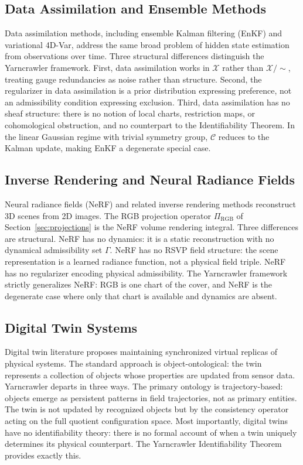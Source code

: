 \documentclass[12pt, oneside]{article}
\newcommand{\Xmod}{\mathcal{X}/{\sim}}
\begin{document}
\subsection{Data Assimilation and Ensemble Methods}

Data assimilation methods, including ensemble Kalman filtering (EnKF) and variational
4D-Var, address the same broad problem of hidden state estimation from observations over
time. Three structural differences distinguish the Yarncrawler framework. First, data
assimilation works in $\mathcal{X}$ rather than $\Xmod$, treating gauge redundancies as
noise rather than structure. Second, the regularizer in data assimilation is a prior
distribution expressing preference, not an admissibility condition expressing exclusion.
Third, data assimilation has no sheaf structure: there is no notion of local charts,
restriction maps, or cohomological obstruction, and no counterpart to the Identifiability
Theorem. In the linear Gaussian regime with trivial symmetry group, $\mathcal{C}$ reduces
to the Kalman update, making EnKF a degenerate special case.

\subsection{Inverse Rendering and Neural Radiance Fields}

Neural radiance fields (NeRF) and related inverse rendering methods reconstruct 3D scenes
from 2D images. The RGB projection operator $\Pi_{\mathrm{RGB}}$ of
Section~\ref{sec:projections} is the NeRF volume rendering integral. Three differences
are structural. NeRF has no dynamics: it is a static reconstruction with no dynamical
admissibility set $\Gamma$. NeRF has no RSVP field structure: the scene representation
is a learned radiance function, not a physical field triple. NeRF has no regularizer
encoding physical admissibility. The Yarncrawler framework strictly generalizes NeRF: RGB
is one chart of the cover, and NeRF is the degenerate case where only that chart is
available and dynamics are absent.

\subsection{Digital Twin Systems}

Digital twin literature proposes maintaining synchronized virtual replicas of physical
systems. The standard approach is object-ontological: the twin represents a collection of
objects whose properties are updated from sensor data. Yarncrawler departs in three ways.
The primary ontology is trajectory-based: objects emerge as persistent patterns in field
trajectories, not as primary entities. The twin is not updated by recognized objects but
by the consistency operator acting on the full quotient configuration space. Most
importantly, digital twins have no identifiability theory: there is no formal account of
when a twin uniquely determines its physical counterpart. The Yarncrawler Identifiability
Theorem provides exactly this.
\end{document}
